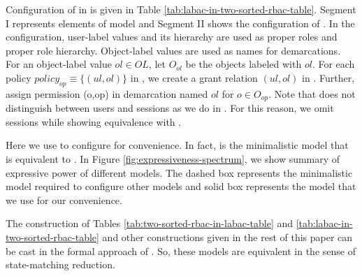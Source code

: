  
 
 Configuration of \hlabac{} in \twoSortedRBAC{} is given in Table \ref{tab:labac-in-two-sorted-rbac-table}. Segment I represents elements of \eapABAC{} model and Segment II shows the configuration of \twoSortedRBAC{}.  In the configuration, user-label values and its hierarchy are used as proper roles and proper role hierarchy. Object-label values are used as names for demarcations. For an object-label value $ol\in OL$, let $O_{ol}$ be the objects labeled with $ol$. For each policy $policy_{op} \equiv \{(ul, ol)\}$ in \eapABAC{}, we create a grant relation $(ul,ol)$ in \twoSortedRBAC{}. Further, assign permission (o,op) in demarcation named $ol$ for $o \in O_{op}$. Note that \twoSortedRBAC{} does not distinguish between users and sessions as we do in \eapABAC{}. For this reason, we omit \eapABAC{} sessions while showing equivalence with \twoSortedRBAC{}.
 
 
 

  
  Here we use \hlabac{} to configure \twoSortedRBAC{} for convenience. In fact,  \clabac{} is the minimalistic model that is equivalent to \twoSortedRBAC{}. In Figure \ref{fig:expressiveness-spectrum}, we show summary of expressive power of different \eapABAC{} models. The dashed box represents the minimalistic \eapABAC{} model required to configure other models and solid box represents the \eapABAC{} model that we use for our convenience. 


The construction of Tables \ref{tab:two-sorted-rbac-in-labac-table} and \ref{tab:labac-in-two-sorted-rbac-table} and other constructions given in the rest of this paper can be cast in the formal approach of \cite{tripli}. So, these models are equivalent in the sense of state-matching reduction. 

  
 
